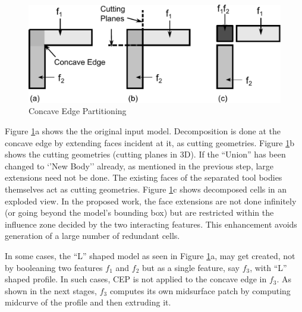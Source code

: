 \begin{itemize}[noitemsep,topsep=2pt,parsep=2pt,partopsep=2pt]




  \begin{figure}[!h]
\centering     %
\includegraphics[width=0.75\linewidth,valign=t]{images/newcep_bw.pdf}
\caption{Concave Edge Partitioning}
\label{fig:litsurvey:newcep}
\end{figure}



Figure \ref{fig:litsurvey:newcep}a shows the the original input model. Decomposition is done at the concave edge by extending faces incident at it, as cutting geometries. Figure \ref{fig:litsurvey:newcep}b shows the cutting geometries (cutting planes in 3D). If the ``Union'' has been changed to `'New Body'' already, as mentioned in the previous step, large extensions need not be done. The existing faces of the separated tool bodies themselves act as cutting geometries.  Figure \ref{fig:litsurvey:newcep}c  shows decomposed cells in an exploded view. In the proposed work, the face extensions are not done infinitely (or going beyond the model's bounding box) but are restricted within the influence zone decided by the two interacting features. This enhancement avoids generation of a large number of redundant cells.
\end{itemize}

In some cases, the ``L'' shaped model as seen in Figure \ref{fig:litsurvey:newcep}a, may get created, not by booleaning two features $f_1$ and $f_2$ but as a single feature, say $f_3$, with ``L'' shaped profile. In such cases, CEP is not applied to the concave edge in $f_3$. As shown in the next stages, $f_3$ computes its own midsurface patch by computing midcurve of the profile and then extruding it.%

